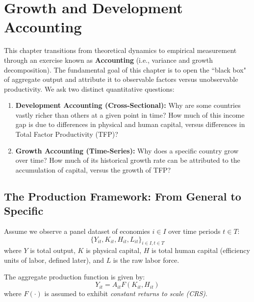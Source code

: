 \chapter{Growth and Development Accounting}

This chapter transitions from theoretical dynamics to empirical measurement through an exercise known as \textbf{Accounting} (i.e., variance and growth decomposition). The fundamental goal of this chapter is to open the ``black box" of aggregate output and attribute it to observable factors versus unobservable productivity. We ask two distinct quantitative questions:
\begin{enumerate}
    \item \textbf{Development Accounting (Cross-Sectional):} Why are some countries vastly richer than others at a given point in time? How much of this income gap is due to differences in physical and human capital, versus differences in Total Factor Productivity (TFP)?
    \item \textbf{Growth Accounting (Time-Series):} Why does a specific country grow over time? How much of its historical growth rate can be attributed to the accumulation of capital, versus the growth of TFP?
\end{enumerate}


\section{The Production Framework: From General to Specific}

Assume we observe a panel dataset of economies $i \in I$ over time periods $t \in T$:
$$
\{Y_{it}, K_{it}, H_{it}, L_{it}\}_{i\in I, t\in T}
$$
where $Y$ is total output, $K$ is physical capital, $H$ is total human capital (efficiency units of labor, defined later), and $L$ is the raw labor force. 

The aggregate production function is given by:
$$
Y_{it} = A_{it} F(K_{it}, H_{it})
$$
where $F(\cdot)$ is assumed to exhibit \textit{constant returns to scale (CRS)}.

